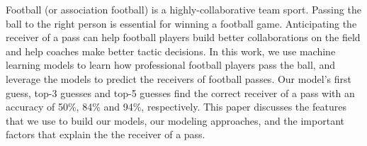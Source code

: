 Football (or association football) is a highly-collaborative team sport. 
Passing the ball to the right person is essential for winning a football game.
Anticipating the receiver of a pass can help football players build better collaborations on the field and help coaches make better tactic decisions.
In this work, we use machine learning models to learn how professional football players pass the ball, and leverage the models to predict the receivers of football passes.
Our model's first guess, top-3 guesses and top-5 guesses find the correct receiver of a pass with an accuracy of 50\%, 84\% and 94\%, respectively.
This paper discusses the features that we use to build our models, our modeling approaches, and the important factors that explain the the receiver of a pass.

